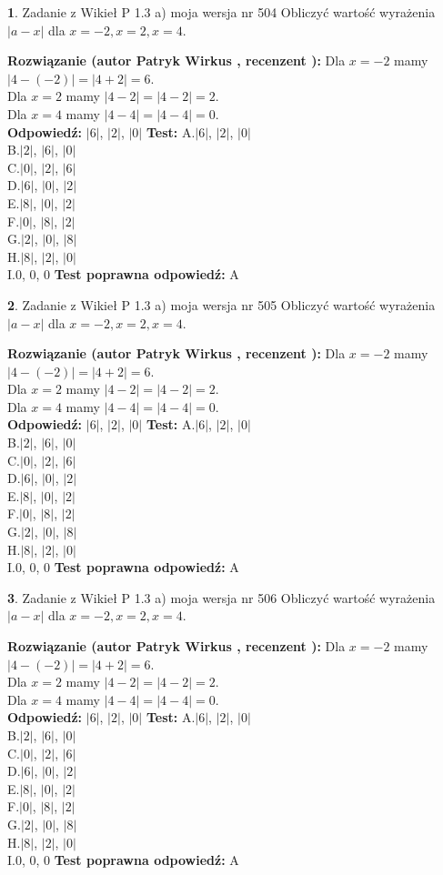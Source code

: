 \documentclass[12pt, a4paper]{article}
\theoremstyle{definition} %
\newtheorem{zad}{}
\newcommand{\zadStart}[1]{\begin{zad}#1\newline}
\newcommand{\zadStop}{\end{zad}}
\newcommand{\rozwStart}[2]{\noindent \textbf{Rozwiązanie (autor #1 , recenzent #2): }\newline}
\newcommand{\rozwStop}{\newline}
\newcommand{\odpStart}{\noindent \textbf{Odpowiedź:}\newline}
\newcommand{\odpStop}{\newline}
\newcommand{\testStart}{\noindent \textbf{Test:}\newline}
\newcommand{\testStop}{\newline}
\newcommand{\kluczStart}{\noindent \textbf{Test poprawna odpowiedź:}\newline}
\newcommand{\kluczStop}{\newline}
\begin{document}
\zadStart{Zadanie z Wikieł P 1.3 a) moja wersja nr 504}
Obliczyć wartość wyrażenia $|a - x|$ dla $x=-2,x=2,x=4$.
\zadStop
\rozwStart{Patryk Wirkus}{}
Dla $x = -2$ mamy $|4 - (-2)| = |4 + 2| = 6$.\\
Dla $x = 2$ mamy $|4 - 2| = |4 - 2| = 2$.\\
Dla $x = 4$ mamy $|4 - 4| = |4 - 4| = 0$.\\
\rozwStop
\odpStart
$|6|$, $|2|$, $|0|$
\odpStop
\testStart
A.$|6|$, $|2|$, $|0|$\\
B.$|2|$, $|6|$, $|0|$\\
C.$|0|$, $|2|$, $|6|$\\
D.$|6|$, $|0|$, $|2|$\\
E.$|8|$, $|0|$, $|2|$\\
F.$|0|$, $|8|$, $|2|$\\
G.$|2|$, $|0|$, $|8|$\\
H.$|8|$, $|2|$, $|0|$\\
I.$0$, $0$, $0$
\testStop
\kluczStart
A
\kluczStop



\zadStart{Zadanie z Wikieł P 1.3 a) moja wersja nr 505}
Obliczyć wartość wyrażenia $|a - x|$ dla $x=-2,x=2,x=4$.
\zadStop
\rozwStart{Patryk Wirkus}{}
Dla $x = -2$ mamy $|4 - (-2)| = |4 + 2| = 6$.\\
Dla $x = 2$ mamy $|4 - 2| = |4 - 2| = 2$.\\
Dla $x = 4$ mamy $|4 - 4| = |4 - 4| = 0$.\\
\rozwStop
\odpStart
$|6|$, $|2|$, $|0|$
\odpStop
\testStart
A.$|6|$, $|2|$, $|0|$\\
B.$|2|$, $|6|$, $|0|$\\
C.$|0|$, $|2|$, $|6|$\\
D.$|6|$, $|0|$, $|2|$\\
E.$|8|$, $|0|$, $|2|$\\
F.$|0|$, $|8|$, $|2|$\\
G.$|2|$, $|0|$, $|8|$\\
H.$|8|$, $|2|$, $|0|$\\
I.$0$, $0$, $0$
\testStop
\kluczStart
A
\kluczStop



\zadStart{Zadanie z Wikieł P 1.3 a) moja wersja nr 506}
Obliczyć wartość wyrażenia $|a - x|$ dla $x=-2,x=2,x=4$.
\zadStop
\rozwStart{Patryk Wirkus}{}
Dla $x = -2$ mamy $|4 - (-2)| = |4 + 2| = 6$.\\
Dla $x = 2$ mamy $|4 - 2| = |4 - 2| = 2$.\\
Dla $x = 4$ mamy $|4 - 4| = |4 - 4| = 0$.\\
\rozwStop
\odpStart
$|6|$, $|2|$, $|0|$
\odpStop
\testStart
A.$|6|$, $|2|$, $|0|$\\
B.$|2|$, $|6|$, $|0|$\\
C.$|0|$, $|2|$, $|6|$\\
D.$|6|$, $|0|$, $|2|$\\
E.$|8|$, $|0|$, $|2|$\\
F.$|0|$, $|8|$, $|2|$\\
G.$|2|$, $|0|$, $|8|$\\
H.$|8|$, $|2|$, $|0|$\\
I.$0$, $0$, $0$
\testStop
\kluczStart
A
\kluczStop
\end{document}
